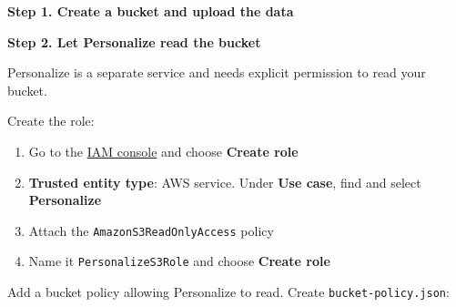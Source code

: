 \vspace{0.5em}\noindent\textbf{Step 1. Create a bucket and upload the
data}\par

\begin{Shaded}
\begin{Highlighting}[]
\OperatorTok{\textless{}}\OperatorTok{\textgreater{}}
\OperatorTok{\textless{}}\OperatorTok{\textgreater{}}
\OperatorTok{\textless{}}\OperatorTok{\textgreater{}}
\end{Highlighting}
\end{Shaded}

\vspace{0.5em}\noindent\textbf{Step 2. Let Personalize read the
bucket}\par

Personalize is a separate service and needs explicit permission to read
your bucket.

Create the role:

\begin{enumerate}
\def\labelenumi{\arabic{enumi}.}
\tightlist
\item
  Go to the \href{https://console.aws.amazon.com/iam/home\#/roles}{IAM
  console} and choose \textbf{Create role}
\item
  \textbf{Trusted entity type}: AWS service. Under \textbf{Use case},
  find and select \textbf{Personalize}
\item
  Attach the \texttt{AmazonS3ReadOnlyAccess} policy
\item
  Name it \texttt{PersonalizeS3Role} and choose \textbf{Create role}
\end{enumerate}

Add a bucket policy allowing Personalize to read. Create
\texttt{bucket-policy.json}:

\begin{Shaded}
\begin{Highlighting}[]
\FunctionTok{\{}
  \FunctionTok{:} \FunctionTok{,}
  \FunctionTok{:} \OtherTok{[}\FunctionTok{\{}
    \FunctionTok{:} \FunctionTok{,}
    \FunctionTok{:} \FunctionTok{\{} \FunctionTok{:}  \FunctionTok{\},}
    \FunctionTok{:} \OtherTok{[}\OtherTok{,} \OtherTok{]}\FunctionTok{,}
    \FunctionTok{:} \OtherTok{[}
      \OtherTok{,}
    \OtherTok{]}
  \FunctionTok{\}}\OtherTok{]}
\FunctionTok{\}}
\end{Highlighting}
\end{Shaded}

